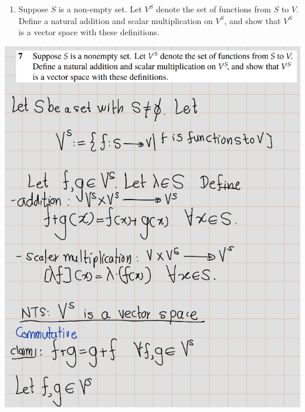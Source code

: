 \documentclass[
]{book}
\providecommand{\tightlist}{%
  \setlength{\itemsep}{0pt}\setlength{\parskip}{0pt}}
\theoremstyle{definition}
\theoremstyle{definition}
\theoremstyle{definition}
\theoremstyle{definition}
\theoremstyle{remark}
\begin{document}
\begin{enumerate}
\def\labelenumi{\arabic{enumi}.}
\setcounter{enumi}{6}
\tightlist
\item
  Suppose \(S\) is a non-empty set.
  Let \(V^S\) denote the set of functions from \(S\) to \(V\).
  Define a natural addition and scalar multiplication on \(V^S\), and show that \(V^S\) is a vector space with these definitions.
\end{enumerate}

\includegraphics[width=9.33in]{fig/Ex1B/Ex7-1}
\end{document}
